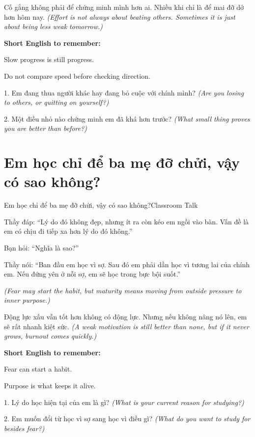\begin{baihoc}
Cố gắng không phải để chứng minh mình hơn ai. Nhiều khi chỉ là để mai đỡ dở hơn hôm nay.
\textit{(Effort is not always about beating others. Sometimes it is just about being less weak tomorrow.)}
\end{baihoc}

\begin{ghinhoanh}
\textbf{Short English to remember:}

Slow progress is still progress.

Do not compare speed before checking direction.
\end{ghinhoanh}

\begin{tuhocnhanh}
1. Em đang thua người khác hay đang bỏ cuộc với chính mình? \textit{(Are you losing to others, or quitting on yourself?)}

2. Một điều nhỏ nào chứng minh em đã khá hơn trước? \textit{(What small thing proves you are better than before?)}
\end{tuhocnhanh}
\ngancach

\section{Em học chỉ để ba mẹ đỡ chửi, vậy có sao không?}
\begin{truyen}{Em học chỉ để ba mẹ đỡ chửi, vậy có sao không?}{Classroom Talk}

Thầy đáp: ``Lý do đó không đẹp, nhưng ít ra còn kéo em ngồi vào bàn. Vấn đề là em có chịu đi tiếp xa hơn lý do đó không.''

Bạn hỏi: ``Nghĩa là sao?''

Thầy nói: ``Ban đầu em học vì sợ. Sau đó em phải dần học vì tương lai của chính em. Nếu đứng yên ở nỗi sợ, em sẽ học trong bực bội suốt.''

\textit{(Fear may start the habit, but maturity means moving from outside pressure to inner purpose.)}
\end{truyen}

\begin{baihoc}
Động lực xấu vẫn tốt hơn không có động lực. Nhưng nếu không nâng nó lên, em sẽ rất nhanh kiệt sức.
\textit{(A weak motivation is still better than none, but if it never grows, burnout comes quickly.)}
\end{baihoc}

\begin{ghinhoanh}
\textbf{Short English to remember:}

Fear can start a habit.

Purpose is what keeps it alive.
\end{ghinhoanh}

\begin{tuhocnhanh}
1. Lý do học hiện tại của em là gì? \textit{(What is your current reason for studying?)}

2. Em muốn đổi từ học vì sợ sang học vì điều gì? \textit{(What do you want to study for besides fear?)}
\end{tuhocnhanh}
\ngancach